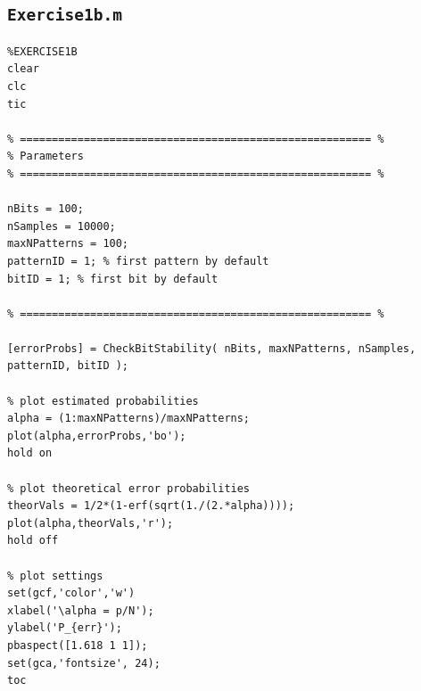 \documentclass[12pt,A4,titlepage]{article}
\begin{document}
\subsection*{\texttt{Exercise1b.m}}
\begin{lstlisting}
%EXERCISE1B
clear
clc
tic

% ======================================================= %
% Parameters
% ======================================================= %

nBits = 100;
nSamples = 10000;
maxNPatterns = 100;
patternID = 1; % first pattern by default
bitID = 1; % first bit by default

% ======================================================= %

[errorProbs] = CheckBitStability( nBits, maxNPatterns, nSamples, patternID, bitID );

% plot estimated probabilities
alpha = (1:maxNPatterns)/maxNPatterns;
plot(alpha,errorProbs,'bo');
hold on

% plot theoretical error probabilities
theorVals = 1/2*(1-erf(sqrt(1./(2.*alpha))));
plot(alpha,theorVals,'r');
hold off

% plot settings
set(gcf,'color','w')
xlabel('\alpha = p/N');
ylabel('P_{err}');
pbaspect([1.618 1 1]);
set(gca,'fontsize', 24);
toc
\end{lstlisting}
\end{document}
